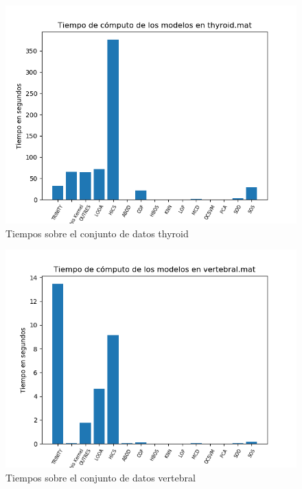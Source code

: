 \begin{figure}[H]
	\centering
	\includegraphics[scale=0.7]{imagenes/imgs-exp1/times/thyroid}
	\caption{Tiempos sobre el conjunto de datos thyroid}
	\label{thyroid_times}
\end{figure}

\begin{figure}[H]
	\centering
	\includegraphics[scale=0.7]{imagenes/imgs-exp1/times/vertebral}
	\caption{Tiempos sobre el conjunto de datos vertebral}
	\label{vertebral_times}
\end{figure}

